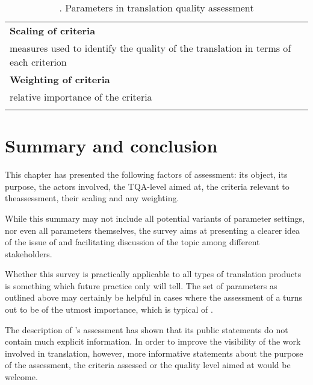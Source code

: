\documentclass[output=paper]{langsci/langscibook}
\begin{document}
\begin{table}
\begin{tabularx}{\textwidth}{Q}
 
 \tablevspace 
{\textbf{Scaling of criteria}}  \\
 measures used to identify the quality of the translation in terms of each criterion  \\
{\textbf{Weighting of criteria}}  \\
 relative importance of the criteria  \\
\lspbottomrule
\end{tabularx}
\caption{\label{tab:vandepitte:1}. Parameters in translation quality assessment}
\end{table}


\section{Summary and conclusion}\label{sec:vandepitte:6}
\largerpage
This chapter has presented the following factors of  assessment: its object, its purpose, the actors involved, the TQA-level aimed at, the criteria relevant to theassessment, their scaling and any weighting. 

While this summary may not include all potential variants of parameter settings, nor even all parameters themselves, the survey aims at presenting a clearer idea of the issue of   and facilitating discussion of the topic among different stakeholders. 

Whether this survey is practically applicable to all types of translation products is something which future practice only will tell. The set of parameters as outlined above may certainly be helpful in cases where the assessment of a  turns out to be of the utmost importance, which is typical of . 

The description of \citeauthor{SCTA2015}'s  assessment has shown that its public statements do not contain much explicit information. In order to improve the visibility of the work involved in translation, however, more informative statements about the purpose of the assessment, the criteria assessed or the quality level aimed at would be welcome. 

  
\sloppy
\printbibliography[heading=subbibliography,notkeyword=this] 
\end{document}
